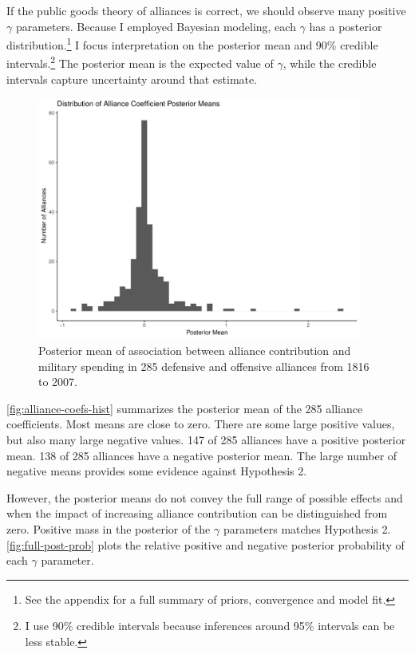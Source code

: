 \documentclass[12pt]{article}
\begin{document}
If the public goods theory of alliances is correct, we should observe many positive $\gamma$ parameters. 
Because I employed Bayesian modeling, each $\gamma$ has a posterior distribution.\footnote{See the appendix for a full summary of priors, convergence and model fit.} 
I focus interpretation on the posterior mean and 90\% credible intervals.\footnote{I use 90\% credible intervals because inferences around 95\% intervals can be less stable.}
The posterior mean is the expected value of $\gamma$, while the credible intervals capture uncertainty around that estimate.  


\begin{figure}[htbp]
	\centering
		\includegraphics[width=0.95\textwidth]{alliance-coefs-hist.pdf}
	\caption{Posterior mean of association between alliance contribution and military spending in 285 defensive and offensive alliances from 1816 to 2007.}
	\label{fig:alliance-coefs-hist}
\end{figure}


\autoref{fig:alliance-coefs-hist} summarizes the posterior mean of the 285 alliance coefficients. 
Most means are close to zero. 
There are some large positive values, but also many large negative values.
147 of 285 alliances have a positive posterior mean. 
138 of 285 alliances have a negative posterior mean. 
The large number of negative means provides some evidence against Hypothesis 2. 


However, the posterior means do not convey the full range of possible effects and when the impact of increasing alliance contribution can be distinguished from zero. 
Positive mass in the posterior of the $\gamma$ parameters matches Hypothesis 2. 
\autoref{fig:full-post-prob} plots the relative positive and negative posterior probability of each $\gamma$ parameter. 
\end{document}

